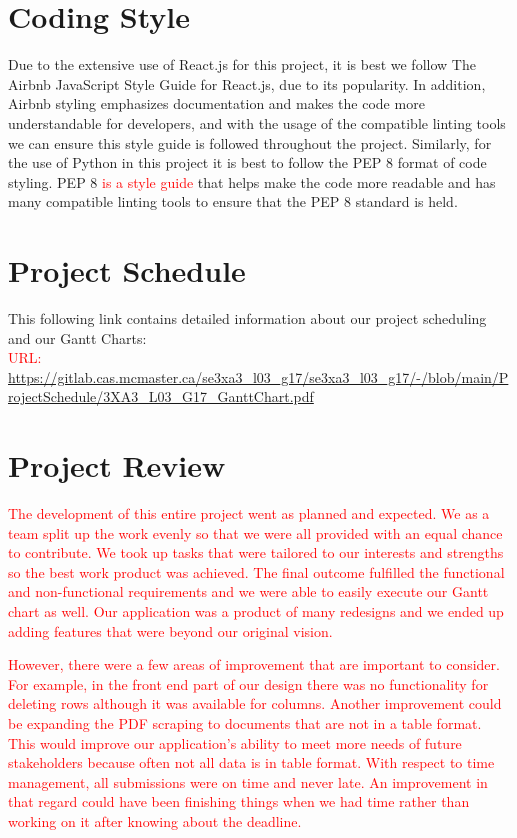 \documentclass[12pt, titlepage]{article}
\begin{document}
\newpage
\section{Coding Style}
Due to the extensive use of React.js for this project, it is best we follow The Airbnb JavaScript Style Guide for React.js, due to its popularity. In addition, Airbnb styling emphasizes documentation and makes the code more understandable for developers, and with the usage of the compatible linting tools we can ensure this style guide is followed throughout the project. Similarly, for the use of Python in this project it is best to follow the PEP 8 format of code styling. PEP 8 \textcolor{red}{is a style guide} that helps make the code more readable and has many compatible linting tools to ensure that the PEP 8 standard is held. 

\section{Project Schedule}
This following link contains detailed information about our project scheduling and our Gantt Charts:\\
\textcolor{red}{URL:}
\url{https://gitlab.cas.mcmaster.ca/se3xa3_l03_g17/se3xa3_l03_g17/-/blob/main/ProjectSchedule/3XA3_L03_G17_GanttChart.pdf}

\section{Project Review}
\textcolor{red}{The development of this entire project went as planned and expected. We as a team split up the work evenly so that we were all provided with an equal chance to contribute. We took up tasks that were tailored to our interests and strengths so the best work product was achieved. The final outcome fulfilled the functional and non-functional requirements and we were able to easily execute our Gantt chart as well. Our application was a product of many redesigns and we ended up adding features that were beyond our original vision.}

\textcolor{red}{However, there were a few areas of improvement that are important to consider. For example, in the front end part of our design there was no functionality for deleting rows although it was available for columns. Another improvement could be expanding the PDF scraping to documents that are not in a table format. This would improve our application’s ability to meet more needs of future stakeholders because often not all data is in table format. With respect to time management, all submissions were on time and never late. An improvement in that regard could have been finishing things when we had time rather than working on it after knowing about the deadline. }
\end{document}

